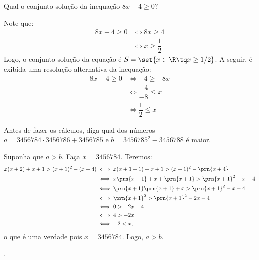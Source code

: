 \begin{example}
Qual o conjunto solução da inequação $8x - 4 \ge 0$?
\end{example}

\begin{solution}
Note que:
%
\begin{align*}
	8x-4 \ge 0 & \iff 8x \ge 4\\
	& \iff x \ge \dfrac{1}{2}
\end{align*}
%
Logo, o conjunto-solução da equação é $S = \set{x \in \R \tq x \ge 1/2}$. A seguir, é exibida uma resolução alternativa da inequação:
%
\begin{align*}
	8x-4 \ge 0 & \iff -4 \ge -8x\\
	& \iff \dfrac{-4}{-8} \le x \\
	& \iff \dfrac{1}{2} \le x 
\end{align*}
\end{solution}	

\begin{example}
Antes de fazer os cálculos, diga qual dos números $a = 3456784 \cdot 3456786 + 3456785$ e $b = 3456785^2 - 3456788$ é maior.
\end{example}

\begin{solution}
Suponha que $a > b$. Faça $x=3456784$. Teremos:
%
\begin{align*}
	x(x+2)+x+1>(x+1)^2 -(x+4)& \iff x(x+1+1)+x+1>(x+1)^2-\prn{x+4}\\
	& \iff x\prn{x+1}+x+\prn{x+1}>\prn{x+1}^2-x-4\\
	& \iff \prn{x+1}\prn{x+1}+x>\prn{x+1}^2-x-4\\
	& \iff \prn{x+1}^2>\prn{x+1}^2-2x-4\\
	& \iff 0>-2x-4\\
	& \iff 4>-2x\\
	& \iff -2<x,
\end{align*}
%
\noindent o que é uma verdade pois $x=3456784$. Logo, $a>b$.
\end{solution}


\begin{onlineact}
	.
\end{onlineact}
